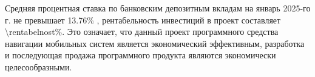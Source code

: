 Средняя процентная ставка по банковским депозитным вкладам на январь
2025-го г. не превышает \num{13.76}\% \cite{nbrb2025}, рентабельность инвестиций
в проект составляет \num{\rentabelnost}\%. Это означает, что данный проект
программного средства навигации мобильных систем является экономический
эффективным, разработка и последующая продажа программного продукта являются
экономически целесообразными.


\renewcommand{\bibsection}{\sectioncentered*{Список использованной литературы}}


